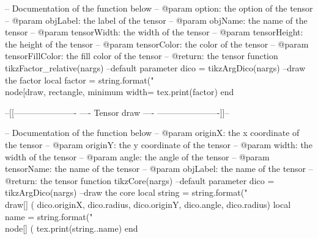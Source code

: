 \begin{luacode*}
	-- Documentation of the function below
	-- @param option: the option of the tensor
	-- @param objLabel: the label of the tensor
	-- @param objName: the name of the tensor
	-- @param tensorWidth: the width of the tensor
	-- @param tensorHeight: the height of the tensor
	-- @param tensorColor: the color of the tensor
	-- @param tensorFillColor: the fill color of the tensor
	-- @return: the tensor
	function tikzFactor_relative(nargs)
	  --default parameter
	  dico = tikzArgDico(nargs)
	  --draw the factor
	  local factor = string.format("\\node[draw, rectangle, minimum width=%
	  tex.print(factor)
	end
  
	--[[----------------------
	----    Tensor draw   ----
	----------------------]]--
  
	-- Documentation of the function below
	-- @param originX: the x coordinate of the tensor
	-- @param originY: the y coordinate of the tensor
	-- @param width: the width of the tensor
	-- @param angle: the angle of the tensor
	-- @param tensorName: the name of the tensor
	-- @param objLabel: the name of the tensor
	-- @return: the tensor
	function tikzCore(nargs)
		--default parameter
		dico = tikzArgDico(nargs)
		--draw the core
		local string = string.format("\\draw[] (%
		dico.originX, dico.radius, dico.originY, dico.angle, dico.radius)
		local name = string.format("\\node[] (%
		tex.print(string..name)
	end
  

\end{luacode*}

